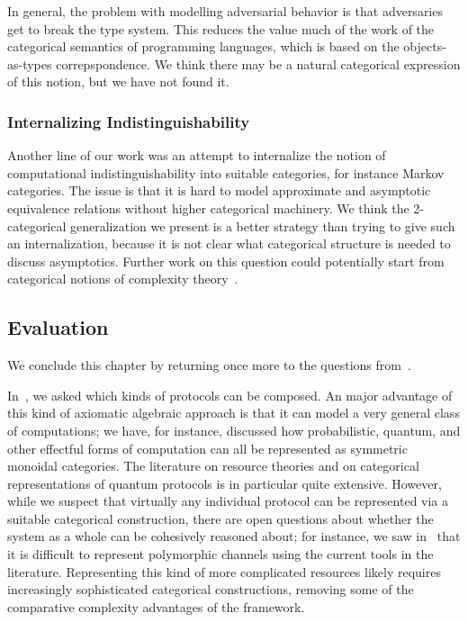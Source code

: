 In general, the problem with modelling adversarial behavior is that adversaries get to
break the type system. This reduces the value much of the work of the categorical
semantics of programming languages, which is based on the objects-as-types
correpspondence. We think there may be a natural categorical expression of this
notion, but we have not found it.

\subsubsection{Internalizing Indistinguishability}

Another line of our work was an attempt to internalize the notion of
computational indistinguishability into suitable categories, for instance Markov
categories. The issue is that it is hard to model approximate and asymptotic
equivalence relations without higher categorical machinery. We think the
2-categorical generalization we present is a better strategy than trying to give
such an internalization, because it is not clear what categorical structure is
needed to discuss asymptotics. Further work on this question could potentially
start from categorical notions of complexity theory~\cite{basu-2020}.

\subsection{Evaluation}
\label{sec:evaluation}

We conclude this chapter by returning once more to the questions
from~. 

In~, we asked which kinds of protocols can be
composed. An major advantage of this kind of axiomatic algebraic approach is
that it can model a very general class of computations; we have, for instance,
discussed how probabilistic, quantum, and other effectful forms of computation
can all be represented as symmetric monoidal categories. The literature on
resource theories and on categorical representations of quantum protocols is in
particular quite extensive. However, while we suspect that virtually any
individual protocol can be represented via a suitable categorical construction,
there are open questions about whether the system as a whole can be cohesively
reasoned about; for instance, we saw in~
that it is difficult to represent polymorphic channels using the current tools
in the literature. Representing this kind of more complicated resources likely
requires increasingly sophisticated categorical constructions, removing some of
the comparative complexity advantages of the framework.

